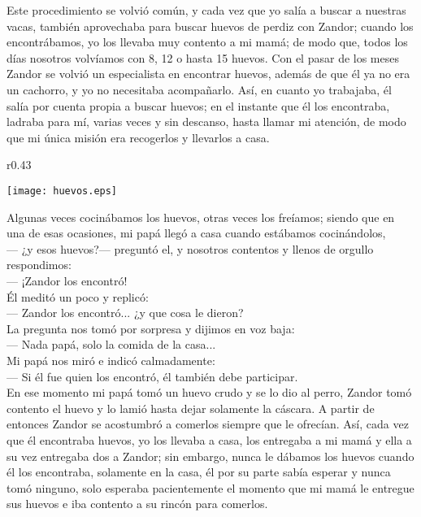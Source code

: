 Este procedimiento se volvió común, y cada vez que yo salía a buscar a nuestras vacas, también aprovechaba para buscar huevos de perdiz con Zandor; cuando los encontrábamos, yo los llevaba muy contento a mi mamá; de modo que, todos los días nosotros volvíamos con 8, 12 o hasta 15 huevos.
Con el pasar de los meses Zandor se volvió un especialista en encontrar huevos, además de que él ya no era un cachorro, y yo no necesitaba acompañarlo. Así, en cuanto yo trabajaba, él salía por cuenta propia a buscar huevos; en el instante que él los encontraba, ladraba para mí, varias veces y sin descanso, hasta llamar mi atención, de modo que mi única misión era recogerlos y llevarlos a casa.
\ifdefined\EnableIncludeImages
\begin{wrapfigure}{r}{0.43\textwidth}
  \begin{center}
  \vspace{-20pt}
    \texttt{[image: huevos.eps]}
  \end{center}
  \vspace{-20pt}
\end{wrapfigure}
\fi
Algunas veces cocinábamos los huevos, otras veces los freíamos; siendo que en una de esas ocasiones, mi papá llegó a casa cuando estábamos cocinándolos,\\\indent
--- ¿y esos huevos?--- preguntó el, 
y nosotros contentos y llenos de orgullo respondimos:\\\indent
--- ¡Zandor los encontró!\\\indent
Él meditó un poco y replicó:\\\indent 
--- Zandor los encontró... ¿y que cosa le dieron?\\\indent 
La pregunta nos tomó por sorpresa y dijimos en voz baja:\\\indent 
--- Nada papá, solo la comida de la casa...\\\indent
Mi papá nos miró e indicó calmadamente:\\\indent 
--- Si él fue quien los encontró, él también debe participar.\\\indent
En ese momento mi papá tomó un huevo crudo y se lo dio al perro, Zandor tomó contento el huevo y lo lamió hasta dejar solamente la cáscara. A partir de entonces Zandor se acostumbró a comerlos siempre que le ofrecían. Así, cada vez que él encontraba huevos, yo los llevaba a casa, los entregaba a mi mamá y ella a su vez entregaba dos a Zandor; sin embargo, nunca le dábamos los huevos cuando él los encontraba, solamente en la casa, él por su parte sabía esperar y nunca tomó ninguno, solo esperaba pacientemente el momento que mi mamá le entregue sus huevos e iba contento a su rincón para comerlos.


